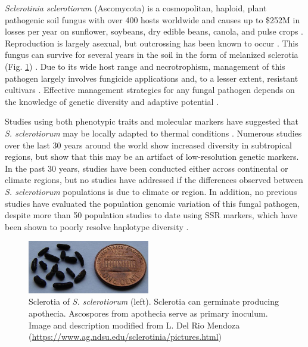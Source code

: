 \documentclass[12pt,letterpaper]{article}
\begin{document}
\textit{Sclerotinia sclerotiorum} (Ascomycota) is a cosmopolitan, haploid, plant pathogenic soil fungus with over 400 hosts worldwide \citep{bolton2006sclerotinia} and causes up to \$252M in losses per year on sunflower, soybeans, dry edible beans, canola, and pulse crops \citep{uscanola}.
Reproduction is largely asexual, but outcrossing has been known to occur \citep{bolton2006sclerotinia,attanayake2014inferring}. 
This fungus can survive for several years in the soil in the form of melanized sclerotia (Fig. \ref{fig:sclerotia}) \citep{bolton2006sclerotinia}.
Due to its wide host range and necrotrophism, management of this pathogen largely involves fungicide applications and, to a lesser extent, resistant cultivars \citep{bolton2006sclerotinia}.
Effective management strategies for any fungal pathogen depends on the knowledge of genetic diversity and adaptive potential \citep{grunwald2016population}. 

Studies using both phenotypic traits and molecular markers have suggested that \textit{S. sclerotiorum} may be locally adapted to thermal conditions \citep{huang1991temperature,carbone2001microbial}.
Numerous studies over the last 30 years around the world show increased diversity in subtropical regions, but \citet{lehner2017sclerotinia} show that this may be an artifact of low-resolution genetic markers.
In the past 30 years, studies have been conducted either across continental or climate regions, but no studies have addressed if the differences observed between \textit{S. sclerotiorum} populations is due to climate or region.
In addition, no previous studies have evaluated the population genomic variation of this fungal pathogen, despite more than 50 population studies to date using SSR markers, which have been shown to poorly resolve haplotype diversity \citep{lehner2017independently}. 

\begin{figure}
  \centering
  \includegraphics[width=0.475\textwidth]{figure/sclerotia.jpg}
  \caption{Sclerotia of \textit{S. sclerotiorum} (left). Sclerotia can germinate producing apothecia. Ascospores from apothecia serve as primary inoculum. Image and description modified from L. Del Rio Mendoza (\url{https://www.ag.ndsu.edu/sclerotinia/pictures.html})}
  \label{fig:sclerotia}
\end{figure}
\end{document}
